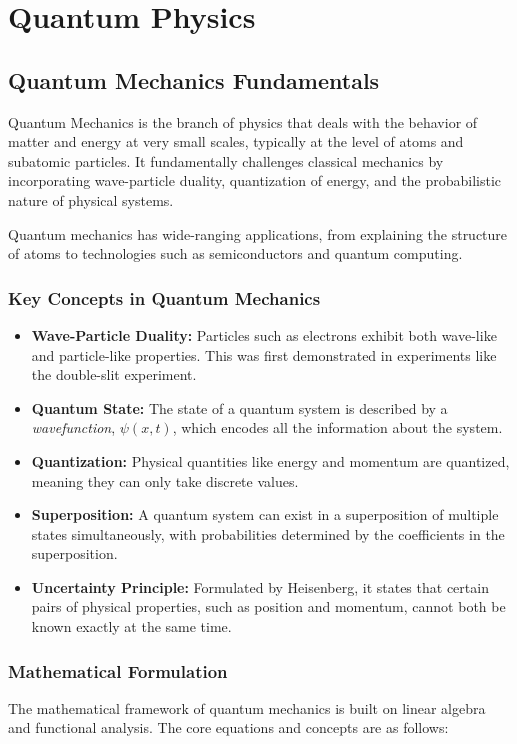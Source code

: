 \chapter{Quantum Physics}

\section{Quantum Mechanics Fundamentals}

Quantum Mechanics is the branch of physics that deals with the behavior of matter and energy at very small scales, typically at the level of atoms and subatomic particles. It fundamentally challenges classical mechanics by incorporating wave-particle duality, quantization of energy, and the probabilistic nature of physical systems.

Quantum mechanics has wide-ranging applications, from explaining the structure of atoms to technologies such as semiconductors and quantum computing.

\subsection{Key Concepts in Quantum Mechanics}
\begin{itemize}
    \item \textbf{Wave-Particle Duality:} Particles such as electrons exhibit both wave-like and particle-like properties. This was first demonstrated in experiments like the double-slit experiment.
    \item \textbf{Quantum State:} The state of a quantum system is described by a \textit{wavefunction}, $\psi(x,t)$, which encodes all the information about the system.
    \item \textbf{Quantization:} Physical quantities like energy and momentum are quantized, meaning they can only take discrete values.
    \item \textbf{Superposition:} A quantum system can exist in a superposition of multiple states simultaneously, with probabilities determined by the coefficients in the superposition.
    \item \textbf{Uncertainty Principle:} Formulated by Heisenberg, it states that certain pairs of physical properties, such as position and momentum, cannot both be known exactly at the same time.
\end{itemize}

\subsection{Mathematical Formulation}
The mathematical framework of quantum mechanics is built on linear algebra and functional analysis. The core equations and concepts are as follows:

